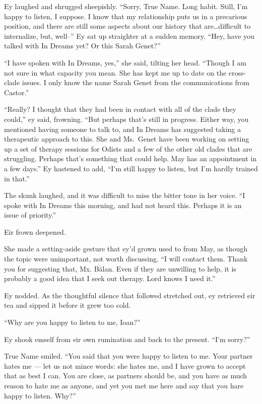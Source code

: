Ey laughed and shrugged sheepishly. ``Sorry, True Name. Long habit. Still, I'm happy to listen, I suppose. I know that my relationship puts us in a precarious position, and there are still some aspects about our history that are\ldots difficult to internalize, but, well--'' Ey sat up straighter at a sudden memory. ``Hey, have you talked with In Dreams yet? Or this Sarah Genet?''

``I have spoken with In Dreams, yes,'' she said, tilting her head. ``Though I am not sure in what capacity you mean. She has kept me up to date on the cross-clade issues. I only know the name Sarah Genet from the communications from Castor.''

``Really? I thought that they had been in contact with all of the clade they could,'' ey said, frowning. ``But perhaps that's still in progress. Either way, you mentioned having someone to talk to, and In Dreams has suggested taking a therapeutic approach to this. She and Ms.~Genet have been working on setting up a set of therapy sessions for Odists and a few of the other old clades that are struggling. Perhaps that's something that could help. May has an appointment in a few days.'' Ey hastened to add, ``I'm still happy to listen, but I'm hardly trained in that.''

The skunk laughed, and it was difficult to miss the bitter tone in her voice. ``I spoke with In Dreams this morning, and had not heard this. Perhaps it is an issue of priority.''

Eir frown deepened.

She made a setting-aside gesture that ey'd grown used to from May, as though the topic were unimportant, not worth discussing. ``I will contact them. Thank you for suggesting that, Mx. Bălan. Even if they are unwilling to help, it is probably a good idea that I seek out therapy. Lord knows I need it.''

Ey nodded. As the thoughtful silence that followed stretched out, ey retrieved eir tea and sipped it before it grew too cold.

``Why are you happy to listen to me, Ioan?''

Ey shook emself from eir own rumination and back to the present. ``I'm sorry?''

True Name smiled. ``You said that you were happy to listen to me. Your partner hates me — let us not mince words: she hates me, and I have grown to accept that as best I can. You are close, as partners should be, and you have as much reason to hate me as anyone, and yet you met me here and say that you hare happy to listen. Why?''

